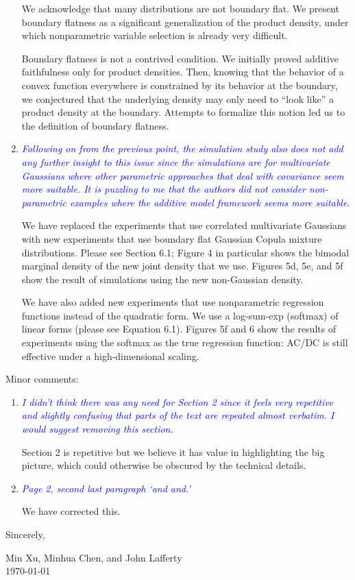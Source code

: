 \documentclass[pdftex,12pt]{article}
\def\rc#1{{\it\textcolor{blue}{#1}}\smallskip}
\begin{document}
\begin{enumerate}
We acknowledge that many distributions are not boundary flat. We present boundary flatness as a significant generalization of the product density, under which nonparametric variable selection is already very difficult.

Boundary flatness is not a contrived condition. We initially proved
additive faithfulness only for product densities. Then, knowing that
the behavior of a convex function everywhere is constrained by its
behavior at the boundary, we conjectured that the underlying density may
only need to ``look like'' a product density at the boundary. Attempts
to formalize this notion led us to the definition of boundary
flatness.

\item \rc{Following on from the previous point, the simulation study also does
not add any further insight to this issue since the simulations are
for multivariate Gaussians where other parametric approaches that deal
with covariance seem more suitable. It is puzzling to me that the
authors did not consider non-parametric examples where the additive
model framework seems more suitable.}

We have replaced the experiments that use correlated multivariate
Gaussians with new experiments that use
boundary flat Gaussian Copula mixture distributions. Please see
Section 6.1; Figure 4 in particular shows the bimodal marginal density
of the new joint density that we use. Figures 5d, 5e, and 5f show the
result of simulations using the new non-Gaussian density.

We have also added new experiments that use nonparametric 
regression functions instead of the quadratic form. We use a
log-sum-exp (softmax) of linear forms (please see Equation
6.1). Figures 5f and 6 show the results of experiments using the
softmax as the true regression function: AC/DC is still effective
under a high-dimensional scaling.

\end{enumerate}

Minor comments:

\begin{enumerate}
\item \rc{I didn't think there was any need for Section 2
  since it feels very repetitive and slightly confusing that parts of
  the text are repeated almost verbatim. I would suggest removing this section.}

Section 2 is repetitive but we believe it has value in highlighting
the big picture, which could otherwise be obscured by the technical
details.

\item \rc{Page 2, second last paragraph `and and.'}

We have corrected this.

\end{enumerate}


\vspace*{10pt}

Sincerely, 


Min Xu, Minhua Chen, and John Lafferty\\[1pt]
\today{}


\end{document}

